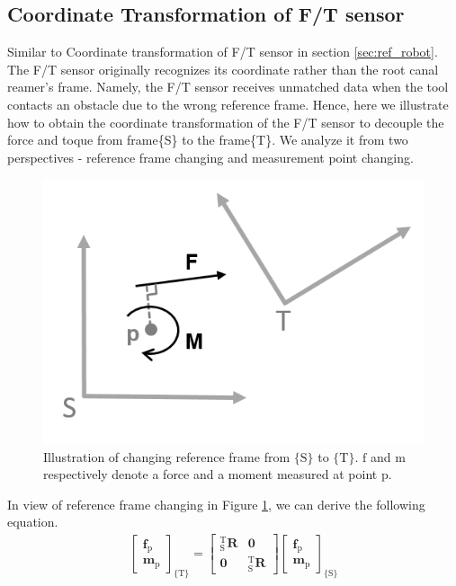 \subsection{Coordinate Transformation of F/T sensor}
\label{sec:rfc}
\hspace*{6mm}Similar to Coordinate transformation of F/T sensor in section \ref{sec:ref_robot}. The F/T sensor originally recognizes its coordinate rather than the root canal reamer's frame. Namely, the F/T sensor receives unmatched data when the tool contacts an obstacle due to the wrong reference frame. Hence, here we illustrate how to obtain the coordinate transformation of the F/T sensor to decouple the force and toque from frame\{S\} to the frame\{T\}. We analyze it from two perspectives - reference frame changing and measurement point changing.
\par
\begin{figure}[htbp]
\begin{center}
\includegraphics[width=0.7\linewidth]{Images/sensor_comp 1.png}
\caption{
Illustration of changing reference frame from $\{\mathrm{S}\} $ to $\{\mathrm{T}\}$. $\mathrm{f}$ and $\mathrm{m}$ respectively denote a force and a moment measured at point p.
}\label{fig:sensor_comp1}
\end{center}
\end{figure}
\par\noindent
In view of reference frame changing in Figure \ref{fig:sensor_comp1}, we can derive the following equation.
\begin{equation}
\begin{split}
\begin{bmatrix}
\boldsymbol{f}_\mathrm{p}\\ 
\boldsymbol{m}_\mathrm{p}
\end{bmatrix}
_{\{ \mathrm{T}\}}
=
\begin{bmatrix}
_\mathrm{S}^\mathrm{T}\mathbf{R} & \boldsymbol{0}\\ 
\boldsymbol{0} & _\mathrm{S}^\mathrm{T}\mathbf{R}
\end{bmatrix}
\begin{bmatrix}
\boldsymbol{f}_\mathrm{p}\\ 
\boldsymbol{m}_\mathrm{p}
\end{bmatrix}
_{\{ \mathrm{S}\}}
\end{split}
\end{equation}
